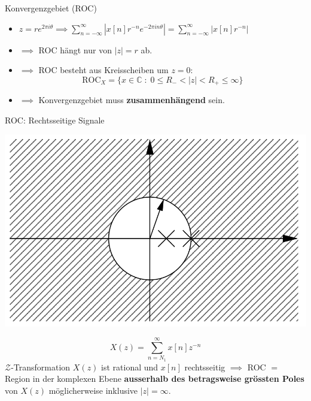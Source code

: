 \documentclass[14pt, aspectratio=169, handout]{beamer}
\begin{document}
\begin{frame}{Konvergenzgebiet (ROC)}
\begin{itemize}
    \item $z= re^{2\pi i \theta} \implies \displaystyle\sum_{n=-\infty}^\infty \left| x[n]r^{-n}e^{-2\pi i n \theta} \right| = \displaystyle\sum_{n=-\infty}^\infty \left| x[n]r^{-n} \right|$
    \item[] $\implies$ ROC hängt nur von $|z|=r$ ab.
    \item[] $\implies$ ROC besteht aus Kreisscheiben um $z=0$:
    $$\text{ROC}_X = \{x \in \mathbb{C} \; : \; 0 \leq R_- < |z| < R_+ \leq \infty\}$$
    \item[] $\implies$ Konvergenzgebiet muss \textbf{zusammenhängend} sein.
\end{itemize}
\end{frame}

\begin{frame}{ROC: Rechtsseitige Signale}
    \begin{minipage}[t]{0.45\textwidth}
        \vspace*{0.25cm}
        \includegraphics[width=\linewidth]{figures/Rechtsseitig.png}
    \end{minipage}
    \hfill
    \begin{minipage}[t]{0.45\textwidth}
        \vspace*{-0.75cm}
        $$X(z) = \sum_{n=N_1}^\infty x[n]z^{-n}$$
        $\mathcal{Z}$-Transformation $X(z)$ ist rational und $x[n]$ rechtsseitig $\implies$ ROC $=$ Region in der komplexen Ebene \textbf{ausserhalb des betragsweise grössten Poles} von $X(z)$ möglicherweise inklusive $|z|=\infty$.
    \end{minipage}
\end{frame}
\end{document}
